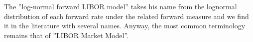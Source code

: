 \documentclass{beamer}
\begin{document}
%
The ”log-normal forward LIBOR model” takes his name from the lognormal distribution of each forward rate under the related forward measure and we find it in the literature with several names. Anyway, the most common terminology remains that of ”LIBOR Market Model”.
\end{document}
